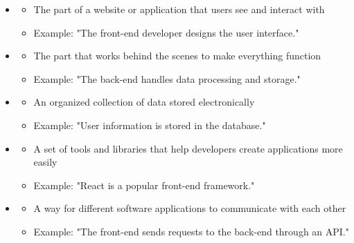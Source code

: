 \begin{vocabbox}[title=Technology and Computing Terms]
\begin{itemize}
    \item {} 
    \begin{itemize}
        \item The part of a website or application that users see and interact with
        \item Example: "The front-end developer designs the user interface."
    \end{itemize}
    \item {} 
    \begin{itemize}
        \item The part that works behind the scenes to make everything function
        \item Example: "The back-end handles data processing and storage."
    \end{itemize}
    \item {} 
    \begin{itemize}
        \item An organized collection of data stored electronically
        \item Example: "User information is stored in the database."
    \end{itemize}
    \item {} 
    \begin{itemize}
        \item A set of tools and libraries that help developers create applications more easily
        \item Example: "React is a popular front-end framework."
    \end{itemize}
    \item {} 
    \begin{itemize}
        \item A way for different software applications to communicate with each other
        \item Example: "The front-end sends requests to the back-end through an API."
    \end{itemize}
\end{itemize}
\end{vocabbox}

